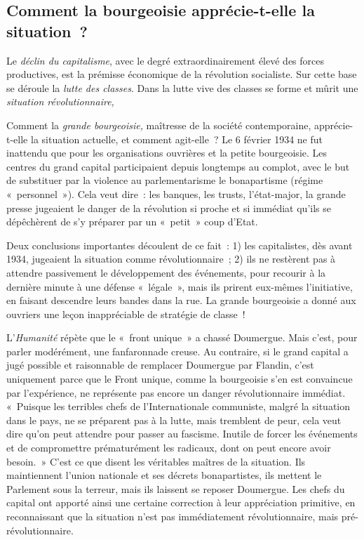 \documentclass[french,twoside]{book} %
\begin{document}
\subsection[{Comment la bourgeoisie apprécie-t-elle la situation ?}]{Comment la bourgeoisie apprécie-t-elle la situation ?}
\noindent Le \emph{déclin du capitalisme}, avec le degré extraordinairement élevé des forces productives, est la prémisse économique de la révolution socialiste. Sur cette base se déroule la \emph{lutte des classes}. Dans la lutte vive des classes se forme et mûrit une \emph{situation révolutionnaire,}\par
Comment la \emph{grande bourgeoisie,} maîtresse de la société contemporaine, apprécie-t-elle la situation actuelle, et comment agit-elle ? Le 6 février 1934 ne fut inattendu que pour les organisations ouvrières et la petite bourgeoisie. Les centres du grand capital participaient depuis longtemps au complot, avec le but de substituer par la violence au parlementarisme le bonapartisme (régime « personnel »). Cela veut dire : les banques, les trusts, l’état-major, la grande presse jugeaient le danger de la révolution si proche et si immédiat qu’ils se dépêchèrent de s’y préparer par un « petit » coup d’Etat.\par
Deux conclusions importantes découlent de ce fait : 1) les capitalistes, dès avant 1934, jugeaient la situation comme révolutionnaire ; 2) ils ne restèrent pas à attendre passivement le développement des événements, pour recourir à la dernière minute à une défense « légale », mais  ils prirent eux-mêmes l’initiative, en faisant descendre leurs bandes dans la rue. La grande bourgeoisie a donné aux ouvriers une leçon inappréciable de stratégie de classe !\par
L’\emph{Humanité} répète que le « front unique » a chassé Doumergue. Mais c’est, pour parler modérément, une fanfaronnade creuse. Au contraire, si le grand capital a jugé possible et raisonnable de remplacer Doumergue par Flandin, c’est uniquement parce que le Front unique, comme la bourgeoisie s’en est convaincue par l’expérience, ne représente pas encore un danger révolutionnaire immédiat. « Puisque les terribles chefs de l’Internationale communiste, malgré la situation dans le pays, ne se préparent pas à la lutte, mais tremblent de peur, cela veut dire qu’on peut attendre pour passer au fascisme. Inutile de forcer les événements et de compromettre prématurément les radicaux, dont on peut encore avoir besoin. » C’est ce que disent les véritables maîtres de la situation. Ils maintiennent l’union nationale et ses décrets bonapartistes, ils mettent le Parlement sous la terreur, mais ils laissent se reposer Doumergue. Les chefs du capital ont apporté ainsi une certaine correction à leur appréciation primitive, en reconnaissant que la situation n’est pas immédiatement révolutionnaire, mais pré-révolutionnaire.\par
\end{document}
